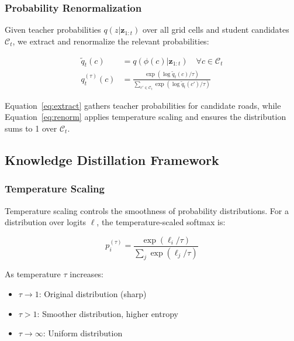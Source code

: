 \subsubsection{Probability Renormalization}
\label{sec:method-renorm}
Given teacher probabilities $q(z | \mathbf{z}_{1:t})$ over all grid cells and student candidates $\mathcal{C}_t$, we extract and renormalize the relevant probabilities:

\begin{align}
\tilde{q}_t(c) &= q(\phi(c) | \mathbf{z}_{1:t}) \quad \forall c \in \mathcal{C}_t \label{eq:extract}\\
q_t^{(\tau)}(c) &= \frac{\exp(\log \tilde{q}_t(c) / \tau)}{\sum_{c' \in \mathcal{C}_t} \exp(\log \tilde{q}_t(c') / \tau)} \label{eq:renorm}
\end{align}

Equation~\eqref{eq:extract} gathers teacher probabilities for candidate roads, while Equation~\eqref{eq:renorm} applies temperature scaling and ensures the distribution sums to 1 over $\mathcal{C}_t$.

\subsection{Knowledge Distillation Framework}
\label{sec:method-distill}

\subsubsection{Temperature Scaling}
\label{sec:method-temp}
Temperature scaling controls the smoothness of probability distributions. For a distribution over logits $\ell$, the temperature-scaled softmax is:

\begin{equation}
p^{(\tau)}_i = \frac{\exp(\ell_i / \tau)}{\sum_j \exp(\ell_j / \tau)}
\label{eq:temp-softmax}
\end{equation}

\begin{definition}
As temperature $\tau$ increases:
\begin{itemize}[noitemsep,topsep=0pt]
\item $\tau \rightarrow 1$: Original distribution (sharp)
\item $\tau > 1$: Smoother distribution, higher entropy
\item $\tau \rightarrow \infty$: Uniform distribution
\end{itemize}
\end{definition}

